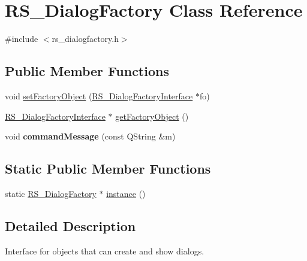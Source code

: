 \hypertarget{classRS__DialogFactory}{\section{R\-S\-\_\-\-Dialog\-Factory Class Reference}
\label{classRS__DialogFactory}
}


{\ttfamily \#include $<$rs\-\_\-dialogfactory.\-h$>$}

\subsection*{Public Member Functions}
\begin{DoxyCompactItemize}
\item 
void \hyperlink{classRS__DialogFactory_a8f7de6e59ceffc14c6fc5b950d5b5701}{set\-Factory\-Object} (\hyperlink{classRS__DialogFactoryInterface}{R\-S\-\_\-\-Dialog\-Factory\-Interface} $\ast$fo)
\item 
\hyperlink{classRS__DialogFactoryInterface}{R\-S\-\_\-\-Dialog\-Factory\-Interface} $\ast$ \hyperlink{classRS__DialogFactory_a22f4191bb22dfff30268ef1cccac6d35}{get\-Factory\-Object} ()
\item 
\hypertarget{classRS__DialogFactory_acb5597e63a3ae2d3bd0bf4b69770e3bf}{void {\bfseries command\-Message} (const Q\-String \&m)}\label{classRS__DialogFactory_acb5597e63a3ae2d3bd0bf4b69770e3bf}

\end{DoxyCompactItemize}
\subsection*{Static Public Member Functions}
\begin{DoxyCompactItemize}
\item 
static \hyperlink{classRS__DialogFactory}{R\-S\-\_\-\-Dialog\-Factory} $\ast$ \hyperlink{classRS__DialogFactory_a0031da41dea72c65098f0e83358793d4}{instance} ()
\end{DoxyCompactItemize}


\subsection{Detailed Description}
Interface for objects that can create and show dialogs. 


